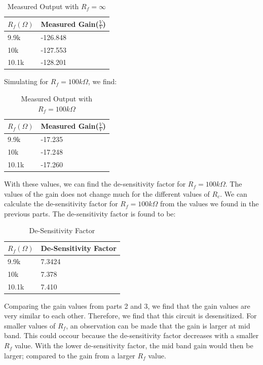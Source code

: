 \documentclass[12pt]{article}
\begin{document}
\begin{table}[h!]
    \centering
    \begin{tabular}{ll}
    $R_f(\Omega)$ & Measured Gain($\frac{V}{V}$) \\ \hline
    9.9k & -126.848 \\ 
    10k & -127.553 \\
    10.1k & -128.201
    \end{tabular}
    \caption{Measured Output with $R_f=\infty$}
    \label{measuredoutinf}
\end{table}
\FloatBarrier

Simulating for $R_f=100k\Omega$, we find:

\begin{table}[h!]
    \centering
    \begin{tabular}{ll}
    $R_f(\Omega)$ & Measured Gain($\frac{V}{V}$) \\ \hline
    9.9k & -17.235 \\ 
    10k & -17.248 \\
    10.1k & -17.260
    \end{tabular}
    \caption{Measured Output with $R_f=100k\Omega$}
    \label{measuredout}
\end{table}
\FloatBarrier 

With these values, we can find the de-sensitivity factor for $R_f=100k\Omega$. The values of the 
gain does not change much for the different values of $R_c$. We can calculate the de-sensitivity factor  for $R_f=100k\Omega$ 
from the values we found in the previous parts. The de-sensitivity factor is found to be:

\begin{table}[h!]
    \centering
    \begin{tabular}{ll}
    $R_f(\Omega)$ & De-Sensitivity Factor \\ \hline
    9.9k & 7.3424 \\ 
    10k & 7.378 \\
    10.1k & 7.410
    \end{tabular}
    \caption{De-Sensitivity Factor}
    \label{desens}
\end{table}
\FloatBarrier

Comparing the gain values from parts 2 and 3, we 
find that the gain values are very similar to each other. Therefore, we find that this 
circuit is desensitized. For smaller values of $R_f$, an observation can be made that the gain is larger at mid band.
This could occour because the de-sensitivity factor decreases with a smaller $R_f$ value. With the lower de-sensitivity 
factor, the mid band gain would then be larger; compared to the gain from a larger $R_f$ value. 
\end{document}
